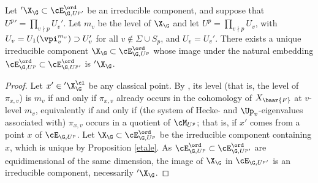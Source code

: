 \begin{lemm}\label{change level} Let ${}'\X_{\G}\subset \cE^{\ord}_{\G, U^{p}{}'}$ be an irreducible component, and suppose that $U^{p}{}'=\prod_{v\nmid p} U_{v}'$. Let $m_{v}$ be the level of $\X_{\G}$ and let $U^{p}=\prod_{v\nmid p} U_{v}$, with $U_{v}=U_{1}(\vpi_{v}^{m_{v}})\supset U_{v}'$ for all $v\notin \Sigma\cup S_{p}$, and $U_{v}=U_{v}'$.  There exists a unique irreducible component $\X_{\G}\subset \cE^{\ord}_{\G, U^{p}}$ whose image under the natural embedding $\cE^{\ord}_{\G, U^{p}}\subset \cE^{\ord}_{\G, U^{p}{}'}$ is ${}'\X_{\G}$.
\end{lemm}
\begin{proof} Let $x'\in {}'\X_{\G}^{\cl}$ be any classical point. By \cite{carayol},  its level (that is, the level of $\pi_{x,v}$) is $m_{v}$ if and only if  $\pi_{x,v}$ already occurs in the cohomology of $X_{\baar{F}}$ at $v$-level $m_{v}$, equivalently if and only if (the system of Hecke- and $\Up_{v}$-eigenvalues associated with) $\pi_{x,v}$ occurs in a quotient of $\cM_{U^{p}}$; that is, if $x'$ comes from a point $x$ of $\cE_{\G, U^{p}}$. Let $\X_{\G}\subset \cE^{\ord}_{\G, U^{p}}$ be the irreducible component containing $x$, which is unique by Proposition \ref{etale}. As $\cE^{\ord}_{\G, U^{p}}\subset \cE^{\ord}_{\G, U^{p}{}'}$ are equidimensional of the same dimension, the image of $\X_{\G}$  in $\cE_{\G, U^{p}{}'}$ is an irreducible component, necessarily ${}'\X_{\G}$.
\end{proof}


